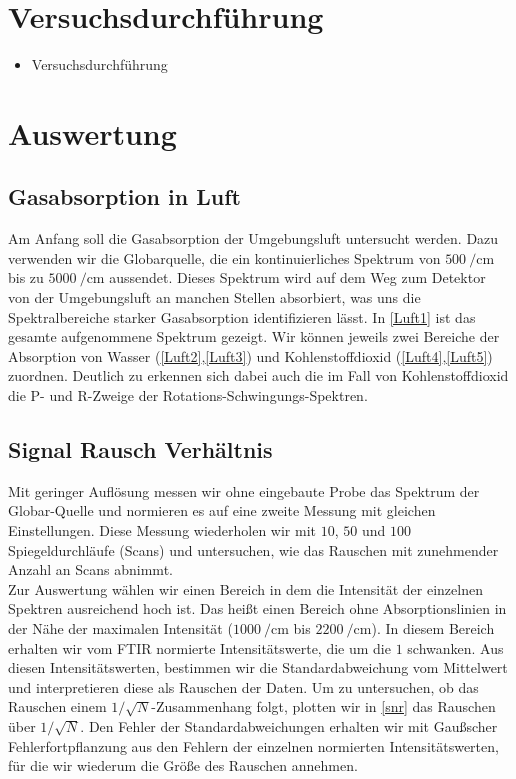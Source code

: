 \documentclass[paper=a4,fontsize=10pt,DIV=18,twocolumn,parskip=half]{scrartcl}
\numberwithin{equation}{section}    %
\begin{document}

\section{Versuchsdurchführung}
\begin{itemize}
\item Versuchsdurchführung
\end{itemize}


\section{Auswertung}

\subsection{Gasabsorption in Luft}
Am Anfang soll die Gasabsorption der Umgebungsluft untersucht werden. 
Dazu verwenden wir die Globarquelle, die ein kontinuierliches Spektrum von $\SI{500}{\per\centi\meter}$ bis zu $\SI{5000}{\per\centi\meter}$ aussendet. 
Dieses Spektrum wird auf dem Weg zum Detektor von der Umgebungsluft an manchen Stellen absorbiert, was uns die Spektralbereiche starker Gasabsorption identifizieren lässt.
In \ref{Luft1} ist das gesamte aufgenommene Spektrum gezeigt. 
Wir können jeweils zwei Bereiche der Absorption von Wasser (\ref{Luft2},\ref{Luft3}) und Kohlenstoffdioxid (\ref{Luft4},\ref{Luft5}) zuordnen. 
Deutlich zu erkennen sich dabei auch die im Fall von Kohlenstoffdioxid die P- und R-Zweige der Rotations-Schwingungs-Spektren.

\subsection{Signal Rausch Verhältnis}
Mit geringer Auflösung messen wir ohne eingebaute Probe das Spektrum der Globar-Quelle und normieren es auf eine zweite Messung mit gleichen Einstellungen. Diese Messung wiederholen wir mit $10$, $50$ und $100$ Spiegeldurchläufe (Scans) und untersuchen, wie das Rauschen mit zunehmender Anzahl an Scans abnimmt.\\
Zur Auswertung wählen wir einen Bereich in dem die Intensität der einzelnen Spektren ausreichend hoch ist. Das heißt einen Bereich ohne Absorptionslinien in der Nähe der maximalen Intensität ($\SI{1000}{\per\centi\meter}$ bis $\SI{2200}{\per\centi\meter}$). In diesem Bereich erhalten wir vom FTIR normierte Intensitätswerte, die um die $1$ schwanken. Aus diesen Intensitätswerten, bestimmen wir die Standardabweichung vom Mittelwert und interpretieren diese als Rauschen der Daten. Um zu untersuchen, ob das Rauschen einem $1/\sqrt{N}$-Zusammenhang folgt, plotten wir in \ref{snr} das Rauschen über $1/\sqrt{N}$. Den Fehler der Standardabweichungen erhalten wir mit Gaußscher Fehlerfortpflanzung aus den Fehlern der einzelnen normierten Intensitätswerten, für die wir wiederum die Größe des Rauschen annehmen.
\end{document}
